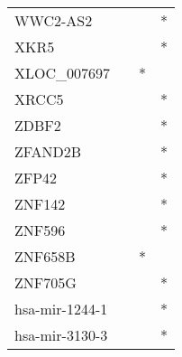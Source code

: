\begin{longtable}{lccc}
WWC2-AS2       &           &     &       * \\
XKR5           &           &     &       * \\
XLOC\_007697    &           &   * &         \\
XRCC5          &           &     &       * \\
ZDBF2          &           &     &       * \\
ZFAND2B        &           &     &       * \\
ZFP42          &           &     &       * \\
ZNF142         &           &     &       * \\
ZNF596         &           &     &       * \\
ZNF658B        &           &   * &         \\
ZNF705G        &           &     &       * \\
hsa-mir-1244-1 &           &     &       * \\
hsa-mir-3130-3 &           &     &       * \\
\end{longtable}
